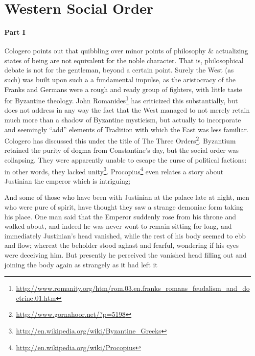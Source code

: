 \section{Western Social Order}

\paragraph{Part I} Cologero points out that quibbling over minor points of philosophy \& actualizing states of being are not equivalent for the noble character. That is, philosophical debate is not for the gentleman, beyond a certain point. Surely the West (as such) was built upon such a a fundamental impulse, as the aristocracy of the Franks and Germans were a rough and ready group of fighters, with little taste for Byzantine theology. John Romanides\footnote{\url{http://www.romanity.org/htm/rom.03.en.franks_romans_feudalism_and_doctrine.01.htm}} has criticized this substantially, but does not address in any way the fact that the West managed to not merely retain much more than a shadow of Byzantine mysticism, but actually to incorporate and seemingly ``add'' elements of Tradition with which the East was less familiar. Cologero has discussed this under the title of The Three Orders\footnote{\url{http://www.gornahoor.net/?p=5198}}. Byzantium retained the purity of dogma from Constantine's day, but the social order was collapsing. They were apparently unable to escape the curse of political factions: in other words, they lacked unity\footnote{\url{http://en.wikipedia.org/wiki/Byzantine_Greeks}}. Procopius\footnote{\url{http://en.wikipedia.org/wiki/Procopius}} even relates a story about Justinian the emperor which is intriguing;

\begin{quotex}
And some of those who have been with Justinian at the palace late at night, men who were pure of spirit, have thought they saw a strange demoniac form taking his place. One man said that the Emperor suddenly rose from his throne and walked about, and indeed he was never wont to remain sitting for long, and immediately Justinian's head vanished, while the rest of his body seemed to ebb and flow; whereat the beholder stood aghast and fearful, wondering if his eyes were deceiving him. But presently he perceived the vanished head filling out and joining the body again as strangely as it had left it
\end{quotex}


